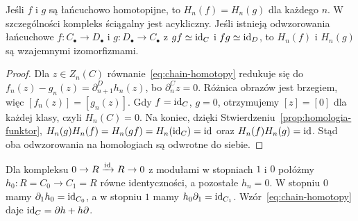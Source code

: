 \begin{twierdzenie}
\label{thm:homotopia-homologia}
Jeśli $f$ i $g$ są łańcuchowo homotopijne,
to $H_n(f)=H_n(g)$ dla każdego $n$.
W szczególności kompleks ściągalny jest
acykliczny. Jeśli istnieją odwzorowania łańcuchowe
$f:C_\bullet\to D_\bullet$ i
$g:D_\bullet\to C_\bullet$ z
$gf\simeq\mathrm{id}_C$ i $fg\simeq\mathrm{id}_D$,
to $H_n(f)$ i $H_n(g)$ są wzajemnymi
izomorfizmami.
\end{twierdzenie}
\begin{proof}
Dla $z\in Z_n(C)$ równanie~\eqref{eq:chain-homotopy}
redukuje się do
$f_n(z)-g_n(z)=\partial^D_{n+1}h_n(z)$,
bo $\partial^C_nz=0$. Różnica obrazów jest
brzegiem, więc $[f_n(z)]=[g_n(z)]$.
Gdy $f=\mathrm{id}_C$, $g=0$, otrzymujemy
$[z]=[0]$ dla każdej klasy, czyli
$H_n(C)=0$.
Na koniec, dzięki Stwierdzeniu~\ref{prop:homologia-funktor},
$H_n(g)H_n(f)=H_n(gf)=H_n(\mathrm{id}_C)=\mathrm{id}$ oraz
$H_n(f)H_n(g)=\mathrm{id}$.
Stąd oba odwzorowania na homologiach są
odwrotne do siebie.
\end{proof}

\begin{przyklad}
Dla kompleksu
$0\to R\xrightarrow{\mathrm{id}}R\to0$
z modułami w stopniach $1$ i $0$
połóżmy $h_0:R=C_0\to C_1=R$
równe identyczności, a pozostałe
$h_n=0$. W stopniu $0$ mamy
$\partial_1h_0=\mathrm{id}_{C_0}$, a w stopniu
$1$ mamy $h_0\partial_1=\mathrm{id}_{C_1}$.
Wzór~\eqref{eq:chain-homotopy}
daje $\mathrm{id}_C=\partial h+h\partial$.
\end{przyklad}

